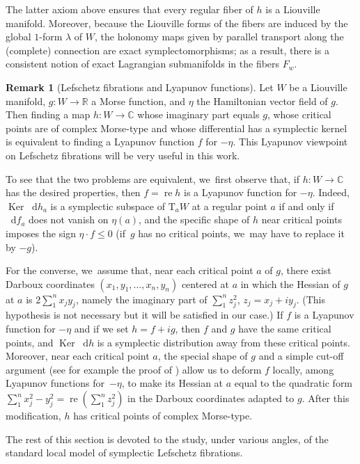 \documentclass[10pt]{amsart}
\newcommand{\C}{{\mathbb C}}
\newcommand{\R}{{\mathbb R}}
\newcommand{\re}{\operatorname{re}}
\newcommand{\Ker}{\operatorname{Ker}}
\newcommand{\etc}{,\ldots,}
\newcommand{\rT}{\mathrm{T}}
\renewcommand{\d}{\mathop{}\!\mathrm d}
\newcommand{\df}{\d f}
\renewcommand{\dh}{\d h}
\let\on\colon
\theoremstyle{plain}
\theoremstyle{definition}
\newtheorem{remark}[theorem]{Remark}
\begin{document}
The latter axiom above ensures that every regular fiber of $h$ is a Liouville
manifold. Moreover, because the Liouville forms of the fibers are induced by the
global $1$-form $\lambda$ of $W$, the holonomy maps given by parallel transport
along the (complete) connection are exact symplectomorphisms; as a result, there
is a consistent notion of exact Lagrangian submanifolds in the fibers $F_w$.

\begin{remark}[Lefschetz fibrations and Lyapunov functions] \label{r:lyap}
Let $W$ be a Liouville manifold, $g \on W \to \R$ a Morse function, and $\eta$
the Hamiltonian vector field of $g$. Then finding a map $h \on W \to \C$ whose
imaginary part equals $g$, whose critical points are of complex Morse-type and
whose differential has a symplectic kernel is equivalent to finding a Lyapunov
function $f$ for $-\eta$. This Lyapunov viewpoint on Lefschetz fibrations will
be very useful in this work.

To see that the two problems are equivalent, we~first observe that, if $h \on W
\to \C$ has the desired properties, then $f = \re h$ is a Lyapunov function for
$-\eta$. Indeed, $\Ker \dh_a$ is a symplectic subspace of $\rT_aW$ at a regular
point $a$ if and only if $\df_a$ does not vanish on $\eta(a)$, and the specific
shape of $h$ near critical points imposes the sign $\eta \cdot f \le 0$ (if~$g$
has no critical points, we~may have to replace it by $-g$).

For the converse, we~assume that, near each critical point $a$ of $g$, there
exist Darboux coordinates $(x_1, y_1 \etc x_n, y_n)$ centered at $a$ in which
the Hessian of $g$ at $a$ is $2 \sum_1^n x_jy_j$, namely the imaginary part of
$\sum_1^n z_j^2$, $z_j = x_j+iy_j$. (This hypothesis is not necessary but it
will be satisfied in our case.) If $f$ is a Lyapunov function for $-\eta$ and if
we set $h = f+ig$, then $f$ and $g$ have the same critical points, and $\Ker\dh$
is a symplectic distribution away from these critical points. Moreover, near
each critical point $a$, the special shape of $g$ and a simple cut-off argument
(see for example the proof of \cite[Lem.\,6.6]{GP}) allow us to deform $f$
locally, among Lyapunov functions for~$-\eta$, to make its Hessian at $a$ equal
to the quadratic form $\sum_1^n x_j^2-y_j^2 = \re \left(\sum_1^n z_j^2\right)$
in the Darboux coordinates adapted to $g$. After this modification, $h$ has
critical points of complex Morse-type.
\end{remark}

The rest of this section is devoted to the study, under various angles, of the
standard local model of symplectic Lefschetz fibrations.
\end{document}
